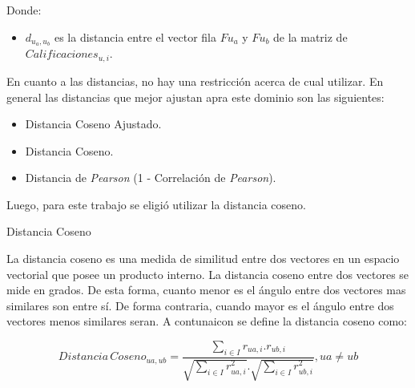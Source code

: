 \documentclass[11pt,a4paper,twoside]{thesis}
\begin{document}
\begin{description}
	\item[Donde:]
\end{description}
\begin{itemize}
	\item $d_{u_a,u_b}$ es la distancia entre el vector fila $F{u_a}$ y $F{u_b}$ de la matriz de $Calificaciones_{u,i}$.
\end{itemize}

En cuanto a las distancias, no hay una restricción acerca de cual utilizar. En
general las distancias que mejor ajustan apra este dominio son las siguientes:

\begin{itemize}
	\item Distancia Coseno Ajustado.
	\item Distancia Coseno.
	\item Distancia de \textit{Pearson} (1 - Correlación de \textit{Pearson}).
\end{itemize}

Luego, para este trabajo se eligió utilizar la distancia coseno.

\begin{description}
	\item[Distancia Coseno]
\end{description}

La distancia coseno es una medida de similitud entre dos vectores en un espacio
vectorial que posee un producto interno. La distancia coseno entre dos vectores
se mide en grados. De esta forma, cuanto menor es el ángulo entre dos vectores
mas similares son entre sí. De forma contraria, cuando mayor es el ángulo entre
dos vectores menos similares seran. A contunaicon se define la distancia coseno
como:

\begin{equation}
	Distancia \mspace{3mu}Coseno_{ua, ub} = \frac{ \sum_{i \in I} r_{ua, i}.r_{ub, i}}{\sqrt{\sum_{i \in I} r_{ua, i}^2}.\sqrt{\sum_{i \in I} r_{ub, i}^2}  }, ua \neq ub
\end{equation}
\end{document}
